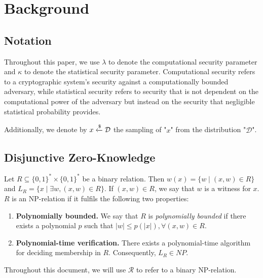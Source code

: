 \section{Background}
\label{sec:background}

\subsection{Notation}
Throughout this paper, we use $\lambda$ to denote the computational security parameter and $\kappa$ to denote the statistical security parameter. Computational security refers to a cryptographic system's security against a computationally bounded adversary, while statistical security refers to security that is not dependent on the computational power of the adversary but instead on the security that negligible statistical probability provides.

Additionally, we denote by $x \xleftarrow{\$} \mathcal D$ the sampling of "$x$" from the distribution "$\mathcal D$". 


\subsection{Disjunctive Zero-Knowledge}

\begin{definition}[NP Relations]
Let $R \subseteq \{0,1\}^* \times \{0,1\}^*$ be a binary relation. Then $w(x) = \{w \mid (x,w) \in R\}$ and $L_R = \{x \mid \exists w, (x,w) \in R\}$. If $(x,w) \in R$, we say that $w$ is a witness for $x$. $R$ is an NP-relation if it fulfils the following two properties:
\begin{enumerate}
    \item \textbf{Polynomially bounded.} We say that $R$ is \textit{polynomially bounded} if there exists a polynomial $p$ such that $|w| \le p(|x|), \forall (x,w) \in R$. 
    \item \textbf{Polynomial-time verification.} There exists a polynomial-time algorithm for deciding membership in $R$. Consequently, $L_R \in NP$. 
\end{enumerate}

Throughout this document, we will use $\mathcal R$ to refer to a binary NP-relation.
\end{definition}

